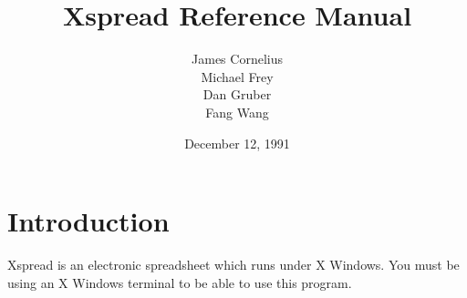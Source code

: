 \topmargin 0in
\headheight 0in
\headsep 0in
\textheight 9in
\textwidth 6.375in
\oddsidemargin 0in
\evensidemargin 0in
\columnsep 0.125in
\columnseprule 0.5pt

\title{\bf Xspread Reference Manual}
\author{James Cornelius\\ Michael Frey\\ Dan Gruber\\ Fang Wang}
\date{December 12, 1991}

\newcommand{\namelistlabel}[1]{\mbox{#1}\hfil}
\newenvironment{namelist}[1]{%
\begin{list}{}
  {
   \let\makelabel\namelistlabel
   \settowidth{\labelwidth}{#1}
   \setlength{\leftmargin}{1.1\labelwidth}
  }
}{%
\end{list}}

\newcommand{\twiddle}{$\tilde{ }$}  %
\newcommand{\ctrl}{\^{ }}


\maketitle
\newpage

\tableofcontents

\newpage

\section*{Introduction}

    Xspread is an electronic spreadsheet which runs under X Windows.
You must be using an X Windows terminal to be able to use this program.

